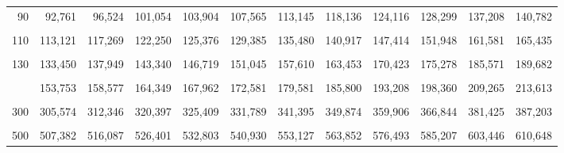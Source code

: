 \documentclass[
  ngerman,
]{article}
\begin{document}
\begin{table}[!h]
{\begin{tabular}{>{}r|rrrrrrrrrrr}
90 & 92,761 & 96,524 & 101,054 & 103,904 & 107,565 & 113,145 & 118,136 & 124,116 & 128,299 & 137,208 & 140,782\\
\addlinespace
\cellcolor{gray!6}{100} & \cellcolor{gray!6}{102,946} & \cellcolor{gray!6}{106,906} & \cellcolor{gray!6}{111,667} & \cellcolor{gray!6}{114,659} & \cellcolor{gray!6}{118,498} & \cellcolor{gray!6}{124,342} & \cellcolor{gray!6}{129,561} & \cellcolor{gray!6}{135,807} & \cellcolor{gray!6}{140,169} & \cellcolor{gray!6}{149,449} & \cellcolor{gray!6}{153,167}\\
110 & 113,121 & 117,269 & 122,250 & 125,376 & 129,385 & 135,480 & 140,917 & 147,414 & 151,948 & 161,581 & 165,435\\
\cellcolor{gray!6}{120} & \cellcolor{gray!6}{123,289} & \cellcolor{gray!6}{127,616} & \cellcolor{gray!6}{132,806} & \cellcolor{gray!6}{136,062} & \cellcolor{gray!6}{140,233} & \cellcolor{gray!6}{146,567} & \cellcolor{gray!6}{152,211} & \cellcolor{gray!6}{158,950} & \cellcolor{gray!6}{163,648} & \cellcolor{gray!6}{173,617} & \cellcolor{gray!6}{177,603}\\
130 & 133,450 & 137,949 & 143,340 & 146,719 & 151,045 & 157,610 & 163,453 & 170,423 & 175,278 & 185,571 & 189,682\\
\cellcolor{gray!6}{140} & \cellcolor{gray!6}{143,604} & \cellcolor{gray!6}{148,269} & \cellcolor{gray!6}{153,854} & \cellcolor{gray!6}{157,352} & \cellcolor{gray!6}{161,827} & \cellcolor{gray!6}{168,613} & \cellcolor{gray!6}{174,648} & \cellcolor{gray!6}{181,840} & \cellcolor{gray!6}{186,847} & \cellcolor{gray!6}{197,451} & \cellcolor{gray!6}{201,683}\\
\addlinespace
150 & 153,753 & 158,577 & 164,349 & 167,962 & 172,581 & 179,581 & 185,800 & 193,208 & 198,360 & 209,265 & 213,613\\
\cellcolor{gray!6}{200} & \cellcolor{gray!6}{204,434} & \cellcolor{gray!6}{209,985} & \cellcolor{gray!6}{216,609} & \cellcolor{gray!6}{220,744} & \cellcolor{gray!6}{226,021} & \cellcolor{gray!6}{233,994} & \cellcolor{gray!6}{241,058} & \cellcolor{gray!6}{249,445} & \cellcolor{gray!6}{255,264} & \cellcolor{gray!6}{267,541} & \cellcolor{gray!6}{272,423}\\
300 & 305,574 & 312,346 & 320,397 & 325,409 & 331,789 & 341,395 & 349,874 & 359,906 & 366,844 & 381,425 & 387,203\\
\cellcolor{gray!6}{400} & \cellcolor{gray!6}{406,535} & \cellcolor{gray!6}{414,335} & \cellcolor{gray!6}{423,590} & \cellcolor{gray!6}{429,340} & \cellcolor{gray!6}{436,649} & \cellcolor{gray!6}{447,632} & \cellcolor{gray!6}{457,305} & \cellcolor{gray!6}{468,724} & \cellcolor{gray!6}{476,606} & \cellcolor{gray!6}{493,132} & \cellcolor{gray!6}{499,666}\\
500 & 507,382 & 516,087 & 526,401 & 532,803 & 540,930 & 553,127 & 563,852 & 576,493 & 585,207 & 603,446 & 610,648\\
\bottomrule
\end{tabular}}
\end{table}
\end{document}

